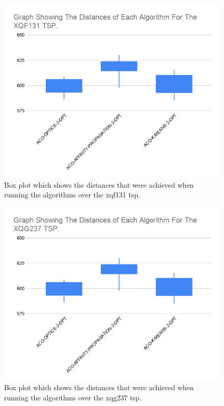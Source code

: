 \begin{figure}
    \centering
    \includegraphics[width=\textwidth]{figures/tsp_distance_xqf131_graph.png}
    \caption{Box plot which shows the distances that were achieved when running the algorithms over the xqf131 tsp.}
    \label{fig:tsp_distance_xqf131_graph}
\end{figure}

\begin{figure}
    \centering
    \includegraphics[width=\textwidth]{figures/tsp_distance_xqg237_graph.png}
    \caption{Box plot which shows the distances that were achieved when running the algorithms over the xqg237 tsp.}
    \label{fig:tsp_distance_xqg237_graph}
\end{figure}

